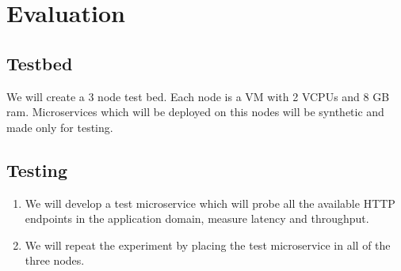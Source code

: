 \section{Evaluation}\label{evaluation}



\subsection{Testbed}
We will create a 3 node test bed. Each node is a VM with 2 VCPUs and 8 GB ram.
Microservices which will be deployed on this nodes will be synthetic and made only for testing.

\subsection{Testing}
\begin{enumerate}
\item We will develop a test microservice which will probe all the available HTTP endpoints in the application domain, measure latency and throughput.
\item We will repeat the experiment by placing the test microservice in all of the three nodes.  
\end{enumerate}
